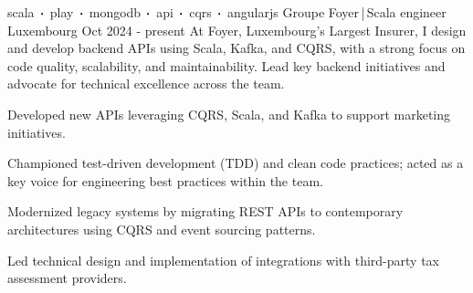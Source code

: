 
\newcommand*{\logo}[2]{\raisebox{-0.2em}{\texttt{[image: \#2]}}\hspace{0.25em}#1}
\newcommand*{\logoonly}[1]{\raisebox{-0.2em}{\texttt{[image: \#1]}}}

\begin{cventries}
    \cventry
    {scala$\sqbig$play$\sqbig$mongodb$\sqbig$api$\sqbig$cqrs$\sqbig$angularjs}
    {\logo{Groupe Foyer}{../../../images/foyer.png}\,|\,Scala engineer}
    {Luxembourg}
    {Oct 2024 - present}
    {At Foyer, Luxembourg's Largest Insurer, I design and develop backend APIs using Scala, Kafka, and CQRS, with a strong focus on code quality, scalability, and maintainability. Lead key backend initiatives and advocate for technical excellence across the team.}
    {
        \begin{cvitems}
            \item{Developed new APIs leveraging CQRS, Scala, and Kafka to support marketing initiatives.}
            \item{Championed test-driven development (TDD) and clean code practices; acted as a key voice for engineering best practices within the team.}
            \item{Modernized legacy systems by migrating REST APIs to contemporary architectures using CQRS and event sourcing patterns.}
            \item{Led technical design and implementation of integrations with third-party tax assessment providers.}
        \end{cvitems}
    }




\end{cventries}
